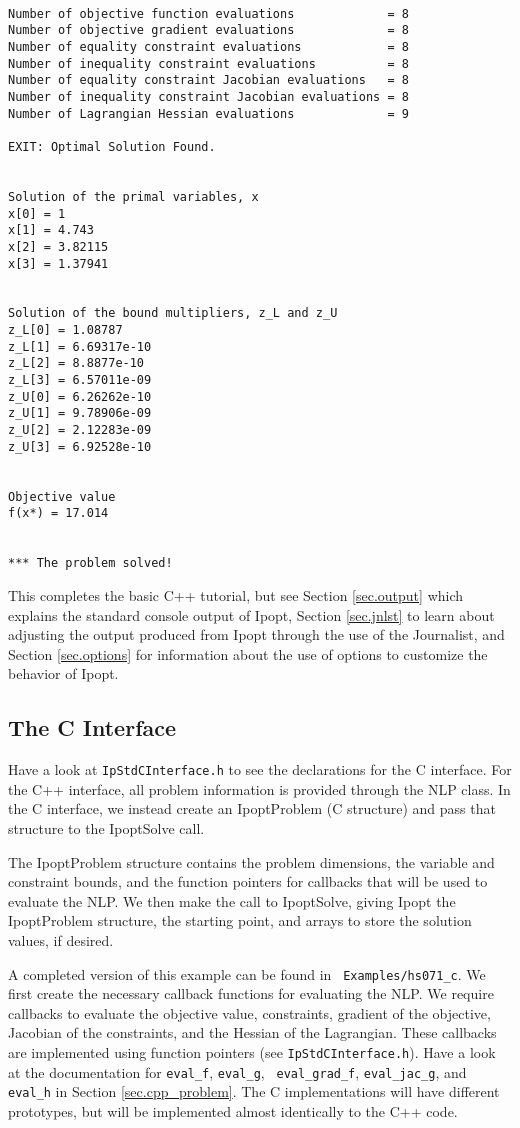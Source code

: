\documentclass[letter,10pt]{article}
\begin{document}
{\begin{verbatim}
 
Number of objective function evaluations             = 8
Number of objective gradient evaluations             = 8
Number of equality constraint evaluations            = 8
Number of inequality constraint evaluations          = 8
Number of equality constraint Jacobian evaluations   = 8
Number of inequality constraint Jacobian evaluations = 8
Number of Lagrangian Hessian evaluations             = 9
 
EXIT: Optimal Solution Found.
 
 
Solution of the primal variables, x
x[0] = 1
x[1] = 4.743
x[2] = 3.82115
x[3] = 1.37941
 
 
Solution of the bound multipliers, z_L and z_U
z_L[0] = 1.08787
z_L[1] = 6.69317e-10
z_L[2] = 8.8877e-10
z_L[3] = 6.57011e-09
z_U[0] = 6.26262e-10
z_U[1] = 9.78906e-09
z_U[2] = 2.12283e-09
z_U[3] = 6.92528e-10
 
 
Objective value
f(x*) = 17.014
 
 
*** The problem solved!
\end{verbatim}

This completes the basic C++ tutorial, but see Section
\ref{sec.output} which explains the standard console output of Ipopt,
Section \ref{sec.jnlst} to learn about adjusting the output produced
from Ipopt through the use of the Journalist, and Section
\ref{sec.options} for information about the use of options to
customize the behavior of Ipopt.

\subsection{The C Interface}
Have a look at {\tt IpStdCInterface.h} to see the declarations for the
C interface.  For the C++ interface, all problem information is
provided through the NLP class. In the C interface, we instead create
an IpoptProblem (C structure) and pass that structure to the
IpoptSolve call.

The IpoptProblem structure contains the problem dimensions, the variable
and constraint bounds, and the function pointers for callbacks that 
will be used to evaluate the NLP.
We then make the call to IpoptSolve, giving Ipopt the IpoptProblem structure, 
the starting point, and arrays to store the solution values, if desired.

A completed version of this example can be found in {\tt
Examples/hs071\_c}.  We first create the necessary callback functions
for evaluating the NLP.  We require callbacks to evaluate the
objective value, constraints, gradient of the objective, Jacobian of
the constraints, and the Hessian of the Lagrangian.  These callbacks
are implemented using function pointers (see {\tt IpStdCInterface.h}).
Have a look at the documentation for {\tt eval\_f}, {\tt eval\_g}, {\tt
eval\_grad\_f}, {\tt eval\_jac\_g}, and {\tt eval\_h} in Section
\ref{sec.cpp_problem}. The C implementations will have different
prototypes, but will be implemented almost identically to the C++
code.

}
\end{document}
